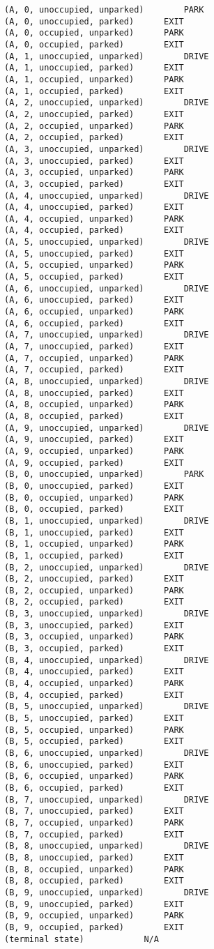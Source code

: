 \documentclass[paper=a4, fontsize=11pt]{scrartcl}
\begin{document}
\begin{verbatim}
(A, 0, unoccupied, unparked)		PARK
(A, 0, unoccupied, parked)		EXIT
(A, 0, occupied, unparked)		PARK
(A, 0, occupied, parked)		EXIT
(A, 1, unoccupied, unparked)		DRIVE
(A, 1, unoccupied, parked)		EXIT
(A, 1, occupied, unparked)		PARK
(A, 1, occupied, parked)		EXIT
(A, 2, unoccupied, unparked)		DRIVE
(A, 2, unoccupied, parked)		EXIT
(A, 2, occupied, unparked)		PARK
(A, 2, occupied, parked)		EXIT
(A, 3, unoccupied, unparked)		DRIVE
(A, 3, unoccupied, parked)		EXIT
(A, 3, occupied, unparked)		PARK
(A, 3, occupied, parked)		EXIT
(A, 4, unoccupied, unparked)		DRIVE
(A, 4, unoccupied, parked)		EXIT
(A, 4, occupied, unparked)		PARK
(A, 4, occupied, parked)		EXIT
(A, 5, unoccupied, unparked)		DRIVE
(A, 5, unoccupied, parked)		EXIT
(A, 5, occupied, unparked)		PARK
(A, 5, occupied, parked)		EXIT
(A, 6, unoccupied, unparked)		DRIVE
(A, 6, unoccupied, parked)		EXIT
(A, 6, occupied, unparked)		PARK
(A, 6, occupied, parked)		EXIT
(A, 7, unoccupied, unparked)		DRIVE
(A, 7, unoccupied, parked)		EXIT
(A, 7, occupied, unparked)		PARK
(A, 7, occupied, parked)		EXIT
(A, 8, unoccupied, unparked)		DRIVE
(A, 8, unoccupied, parked)		EXIT
(A, 8, occupied, unparked)		PARK
(A, 8, occupied, parked)		EXIT
(A, 9, unoccupied, unparked)		DRIVE
(A, 9, unoccupied, parked)		EXIT
(A, 9, occupied, unparked)		PARK
(A, 9, occupied, parked)		EXIT
(B, 0, unoccupied, unparked)		PARK
(B, 0, unoccupied, parked)		EXIT
(B, 0, occupied, unparked)		PARK
(B, 0, occupied, parked)		EXIT
(B, 1, unoccupied, unparked)		DRIVE
(B, 1, unoccupied, parked)		EXIT
(B, 1, occupied, unparked)		PARK
(B, 1, occupied, parked)		EXIT
(B, 2, unoccupied, unparked)		DRIVE
(B, 2, unoccupied, parked)		EXIT
(B, 2, occupied, unparked)		PARK
(B, 2, occupied, parked)		EXIT
(B, 3, unoccupied, unparked)		DRIVE
(B, 3, unoccupied, parked)		EXIT
(B, 3, occupied, unparked)		PARK
(B, 3, occupied, parked)		EXIT
(B, 4, unoccupied, unparked)		DRIVE
(B, 4, unoccupied, parked)		EXIT
(B, 4, occupied, unparked)		PARK
(B, 4, occupied, parked)		EXIT
(B, 5, unoccupied, unparked)		DRIVE
(B, 5, unoccupied, parked)		EXIT
(B, 5, occupied, unparked)		PARK
(B, 5, occupied, parked)		EXIT
(B, 6, unoccupied, unparked)		DRIVE
(B, 6, unoccupied, parked)		EXIT
(B, 6, occupied, unparked)		PARK
(B, 6, occupied, parked)		EXIT
(B, 7, unoccupied, unparked)		DRIVE
(B, 7, unoccupied, parked)		EXIT
(B, 7, occupied, unparked)		PARK
(B, 7, occupied, parked)		EXIT
(B, 8, unoccupied, unparked)		DRIVE
(B, 8, unoccupied, parked)		EXIT
(B, 8, occupied, unparked)		PARK
(B, 8, occupied, parked)		EXIT
(B, 9, unoccupied, unparked)		DRIVE
(B, 9, unoccupied, parked)		EXIT
(B, 9, occupied, unparked)		PARK
(B, 9, occupied, parked)		EXIT
(terminal state)			N/A
\end{verbatim}
\end{document}
